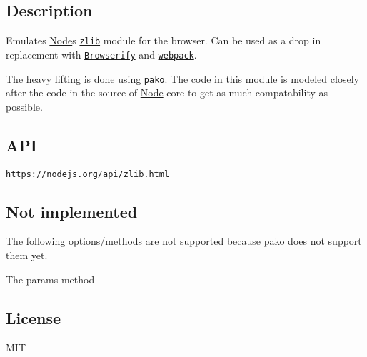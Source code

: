 \href{https://travis-ci.org/devongovett/browserify-zlib}{\tt } \href{https://david-dm.org/devongovett/browserify-zlib}{\tt } \href{https://github.com/feross/standard}{\tt }

\subsection*{Description}

Emulates \mbox{\hyperlink{classNode}{Node}}\textquotesingle{}s \href{https://nodejs.org/api/zlib.html}{\tt zlib} module for the browser. Can be used as a drop in replacement with \href{http://browserify.org}{\tt Browserify} and \href{http://webpack.github.io/}{\tt webpack}.

The heavy lifting is done using \href{https://github.com/nodeca/pako}{\tt pako}. The code in this module is modeled closely after the code in the source of \mbox{\hyperlink{classNode}{Node}} core to get as much compatability as possible.

\subsection*{A\+PI}

\href{https://nodejs.org/api/zlib.html}{\tt https\+://nodejs.\+org/api/zlib.\+html}

\subsection*{Not implemented}

The following options/methods are not supported because pako does not support them yet.


\begin{DoxyItemize}
\item The {\ttfamily params} method
\end{DoxyItemize}

\subsection*{License}

M\+IT 